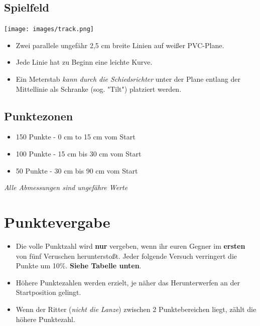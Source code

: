 \documentclass[a4paper,12pt]{article}
\begin{document}
\subsection{Spielfeld}
\texttt{[image: images/track.png]}
\begin{itemize}
	\item Zwei parallele ungefähr 2,5 cm breite Linien auf weißer PVC-Plane.
	\item Jede Linie hat zu Beginn eine leichte Kurve.
	\item Ein Meterstab \emph{kann durch die Schiedsrichter} unter der
		Plane entlang der Mittellinie als Schranke (sog. "Tilt")
		platziert werden.
\end{itemize}
\subsection{Punktezonen}
\begin{itemize}
	\item 150 Punkte - 0 cm to 15 cm vom Start
	\item 100 Punkte - 15 cm bis 30 cm vom Start
	\item  50 Punkte - 30 cm bis 90 cm vom Start
\end{itemize}
\begin{center}
	\emph{Alle Abmessungen sind ungefähre Werte}
\end{center}
\section{Punktevergabe}
\begin{itemize}
	\item Die volle Punktzahl wird \textbf{nur} vergeben, wenn ihr euren
		Gegner im \textbf{ersten} von fünf Veruschen herunterstoßt.
		Jeder folgende Versuch verringert die Punkte um 10\%.
		\textbf{Siehe Tabelle unten}.
	\item Höhere Punktezahlen werden erzielt, je näher das Herunterwerfen
		an der Startposition gelingt.
	\item Wenn der Ritter (\emph{nicht die Lanze}) zwischen 2
		Punktebereichen liegt, zählt die höhere Punktezahl.
\end{itemize}
\end{document}

